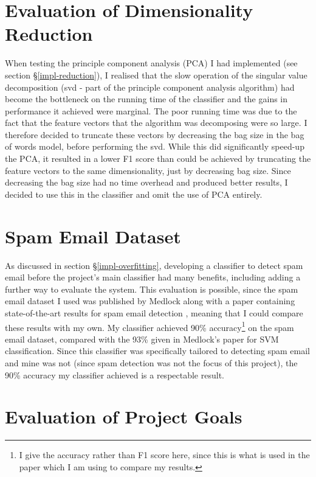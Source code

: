 \documentclass[12pt,a4paper,twoside,openright]{report}
\begin{document}
\section{Evaluation of Dimensionality Reduction} \label{eval-reduction}

When testing the principle component analysis (PCA) I had implemented (see section \S\ref{impl-reduction}), I realised that the slow operation of the singular value decomposition (svd - part of the principle component analysis algorithm) had become the bottleneck on the running time of the classifier and the gains in performance it achieved were marginal. The poor running time was due to the fact that the feature vectors that the algorithm was decomposing were so large. I therefore decided to truncate these vectors by decreasing the bag size in the bag of words model, before performing the svd. While this did significantly speed-up the PCA, it resulted in a lower F1 score than could be achieved by truncating the feature vectors to the same dimensionality, just by decreasing bag size. Since decreasing the bag size had no time overhead and produced better results, I decided to use this in the classifier and omit the use of PCA entirely.


\section{Spam Email Dataset} \label{eval-spam}

As discussed in section \S\ref{impl-overfitting}, developing a classifier to detect spam email before the project's main classifier had many benefits, including adding a further way to evaluate the system. This evaluation is possible, since the spam email dataset I used was published by Medlock along with a paper containing state-of-the-art results for spam email detection \cite{spampaper}, meaning that I could compare these results with my own. My classifier achieved 90\% accuracy\footnote{I give the accuracy rather than F1 score here, since this is what is used in the paper which I am using to compare my results.} on the spam email dataset, compared with the 93\% given in Medlock's paper for SVM classification. Since this classifier was specifically tailored to detecting spam email and mine was not (since spam detection was not the focus of this project), the 90\% accuracy my classifier achieved is a respectable result.

\section{Evaluation of Project Goals} \label{eval-goals}
\end{document}
